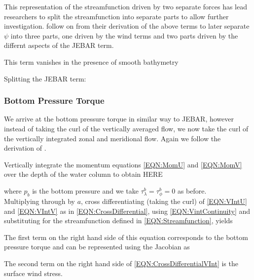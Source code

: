 \documentclass[..\EOYR.tex]{subfiles}
\begin{document}
This representation of the streamfunction driven by two separate forces has lead  researchers to split the streamfunction into separate parts to allow further investigation. \citep{Greatbatch1991} follow on from their derivation of the above terms to later separate $\psi$ into three parts, one driven by the wind terms and two parts driven by the differnt aspects of the JEBAR term.  




This term vanishes in the presence of smooth bathymetry 

Splitting the JEBAR term:



\subsubsection*{Bottom Pressure Torque}

We arrive at the bottom pressure torque in similar way to JEBAR, however instead of taking the curl of the vertically averaged flow, we now take the curl of the vertically integrated zonal and meridional flow.
Again we follow the derivation of \citep{Greatbatch1991}.

Vertically integrate the momentum equations \ref{EQN:MomU} and \ref{EQN:MomV} over the depth of the water column to obtain HERE


where $p_b$ is the bottom pressure and we take $\tau_\lambda^b=\tau_\phi^b=0$ as before.\\
Multiplying through by $a$, cross differentiating (taking the curl) of \ref{EQN:VIntU} and \ref{EQN:VIntV} as in \ref{EQN:CrossDifferential}, using \ref{EQN:VintContinuity} and substituting for the streamfunction defined in \ref{EQN:Streamfunction}, yields



The first term on the right hand side of this equation corresponds to the bottom pressure torque and can be represented using the Jacobian as



The second term on the right hand side of \ref{EQN:CrossDifferentialVInt} is the surface wind stress.
\end{document}
